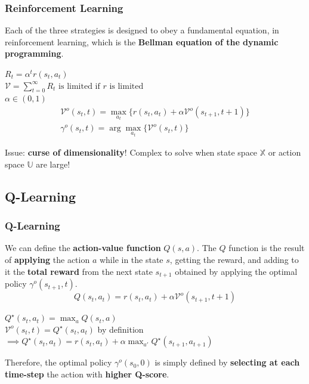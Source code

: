 \documentclass{beamer}
\begin{document}
\begin{frame}
\frametitle{Reinforcement Learning}
Each of the three strategies is designed to obey a fundamental equation, in reinforcement learning, which is the \textbf{Bellman equation of the dynamic programming}.
\begin{theorem} 
	$
	R_t =  \alpha^t r(s_t, a_t)$ 
	\\
	$\mathcal{V} = \sum_{t=0}^{\infty}R_t \text{ is limited if $r$ is limited}
	$
	\\
	$ \alpha \in (0,1) $
	\\
	\begin{equation}
	\begin{aligned}
	\mathcal{V}^o(s_t,t) = \max_{a_t}
	\bigg\{ r(s_t, a_t) + \alpha\mathcal{V}^o(s_{t+1}, t+1) \bigg\} \\
	\gamma^o(s_t, t) = \arg \max_{a_t} 		\big\{ \mathcal{V}^o(s_t,t)\big\}
	\end{aligned}
	\end{equation}

\end{theorem}
Issue: \textbf{curse of dimensionality}! Complex to solve when state space $\mathbb{X}$ or action space $\mathbb{U}$ are large!
\end{frame}
\begin{frame}
\subsection{Q-Learning}
\frametitle{Q-Learning}
We can define the \textbf{action-value function} $Q(s,a) $. The $Q$ function is the result of \textbf{applying} the action $a$ while in the state $s$, getting the reward, and adding to it the \textbf{total reward} from the next state $s_{t+1}$ obtained by applying the optimal policy $\gamma^o(s_{t+1}, t)$.
\begin{equation}
	Q(s_t,a_t) = r(s_t, a_t) + \alpha \mathcal{V}^o(s_{t+1}, t+1)
\end{equation}
\begin{theorem}
	$Q^\star(s_t, a_t) = \max_{a} Q(s_t, a)$ \\
	$\mathcal{V}^o(s_t, t) = Q^\star(s_t, a_t)$ by definition \\
	$ \implies	Q^\star (s_t,a_t) = r(s_t, a_t) + \alpha \max_{a'} Q^\star(s_{t+1}, a_{t+1})$
\end{theorem}
Therefore, the optimal policy $\gamma^o(s_0, 0)$ is simply defined by \textbf{selecting at each time-step} the action with \textbf{higher Q-score}.
\end{frame}
\end{document}
